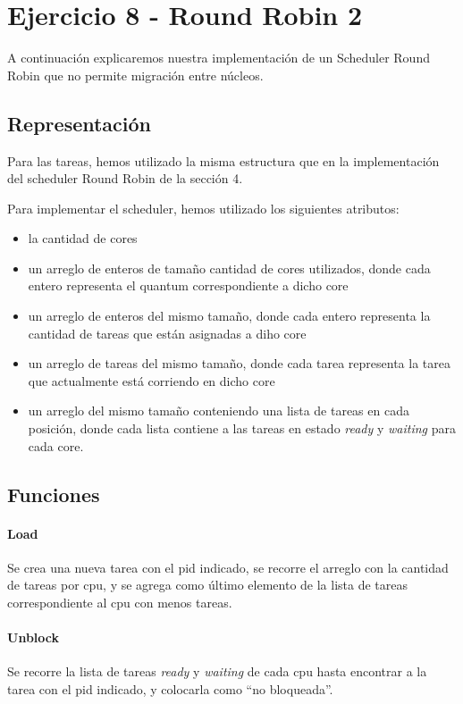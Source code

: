 \section{Ejercicio 8 - Round Robin 2}

A continuación explicaremos nuestra implementación de un Scheduler Round Robin que no permite migración entre núcleos.

\subsection{Representación}

Para las tareas, hemos utilizado la misma estructura que en la implementación del scheduler Round Robin de la sección 4.

Para implementar el scheduler, hemos utilizado los siguientes atributos:

\begin{itemize}
\item la cantidad de cores
\item un arreglo de enteros de tamaño cantidad de cores utilizados, donde cada entero representa el quantum correspondiente a dicho core
\item un arreglo de enteros del mismo tamaño, donde cada entero representa la cantidad de tareas que están asignadas a diho core
\item un arreglo de tareas del mismo tamaño, donde cada tarea representa la tarea que actualmente está corriendo en dicho core
\item un arreglo del mismo tamaño conteniendo una lista de tareas en cada posición, donde cada lista contiene a las tareas en estado {\it ready} y {\it waiting} para cada core.
\end{itemize}

\subsection{Funciones}

\paragraph{Load} Se crea una nueva tarea con el pid indicado, se recorre el arreglo con la cantidad de tareas por cpu, y se agrega como último elemento de la lista de tareas correspondiente al cpu con menos tareas.

\paragraph{Unblock} Se recorre la lista de tareas {\it ready} y {\it waiting} de cada cpu hasta encontrar a la tarea con el pid indicado, y colocarla como ``no bloqueada''.

